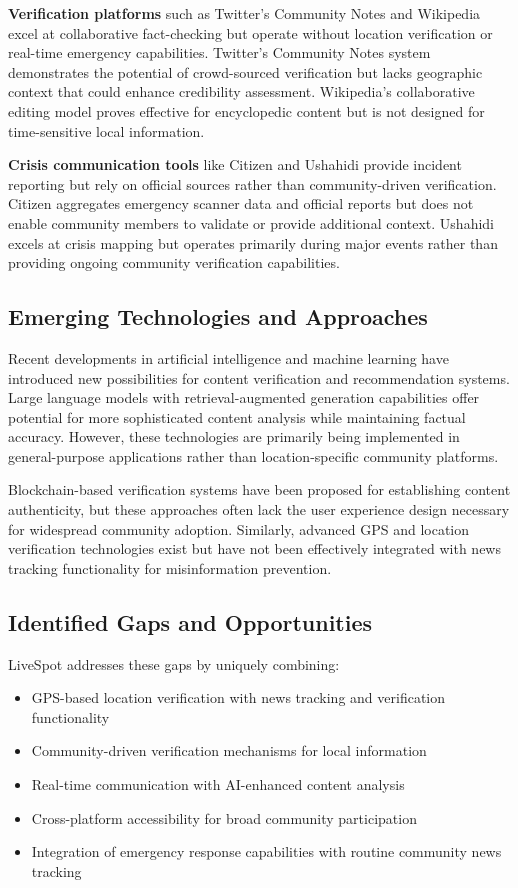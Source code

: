 \textbf{Verification platforms} such as Twitter's Community Notes and Wikipedia excel at collaborative fact-checking but operate without location verification or real-time emergency capabilities. Twitter's Community Notes system demonstrates the potential of crowd-sourced verification but lacks geographic context that could enhance credibility assessment. Wikipedia's collaborative editing model proves effective for encyclopedic content but is not designed for time-sensitive local information.

\textbf{Crisis communication tools} like Citizen and Ushahidi provide incident reporting but rely on official sources rather than community-driven verification. Citizen aggregates emergency scanner data and official reports but does not enable community members to validate or provide additional context. Ushahidi excels at crisis mapping but operates primarily during major events rather than providing ongoing community verification capabilities.

\subsection{Emerging Technologies and Approaches}
\label{subsec:emerging_tech}

Recent developments in artificial intelligence and machine learning have introduced new possibilities for content verification and recommendation systems. Large language models with retrieval-augmented generation capabilities offer potential for more sophisticated content analysis while maintaining factual accuracy. However, these technologies are primarily being implemented in general-purpose applications rather than location-specific community platforms.

Blockchain-based verification systems have been proposed for establishing content authenticity, but these approaches often lack the user experience design necessary for widespread community adoption. Similarly, advanced GPS and location verification technologies exist but have not been effectively integrated with news tracking functionality for misinformation prevention.

\subsection{Identified Gaps and Opportunities}
\label{subsec:gaps_opportunities}

LiveSpot addresses these gaps by uniquely combining:
\begin{itemize}
    \item GPS-based location verification with news tracking and verification functionality
    \item Community-driven verification mechanisms for local information
    \item Real-time communication with AI-enhanced content analysis
    \item Cross-platform accessibility for broad community participation
    \item Integration of emergency response capabilities with routine community news tracking
\end{itemize}

